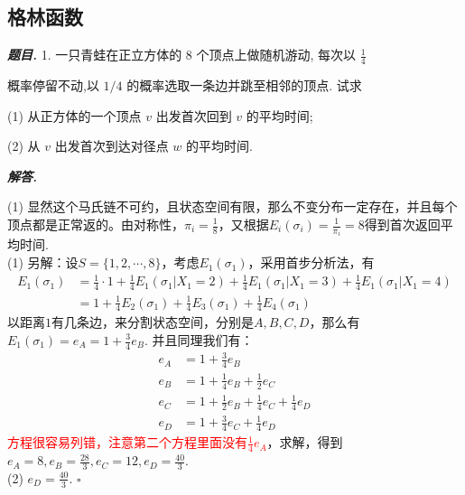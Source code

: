 \documentclass[10pt, a4paper, oneside]{ctexart}
\newenvironment{problem}{\begin{framed}\par\noindent\textbf{\textit{题目. }}}{\end{framed}\par}
\newenvironment{solution}{%
  \par\noindent\textbf{\textit{解答. }}\ignorespaces
}{%
  \hfill\ensuremath{\square}\par %
}
\begin{document}
\subsection{格林函数}
\begin{problem}
    1. 一只青蛙在正立方体的 8 个顶点上做随机游动, 每次以 $\frac{1}{4}$

概率停留不动,以 \( 1/4 \) 的概率选取一条边并跳至相邻的顶点. 试求

(1) 从正方体的一个顶点 \( v \) 出发首次回到 \( v \) 的平均时间;

(2) 从 \( v \) 出发首次到达对径点 \( w \) 的平均时间.
\end{problem}
\begin{solution}
    (1) 显然这个马氏链不可约，且状态空间有限，那么不变分布一定存在，并且每个顶点都是正常返的。由对称性，$\pi_i=\frac{1}{8}$，又根据$E_i(\sigma_i)=\frac{1}{\pi_i}=8$得到首次返回平均时间.\\
    (1) 另解：设$S=\{1,2,\cdots,8\}$，考虑$E_1(\sigma_1)$，采用首步分析法，有
    \begin{align*}
        E_1(\sigma_1)&=\frac{1}{4}\cdot 1+\frac{1}{4} E_1(\sigma_1|X_1=2)+\frac{1}{4} E_1(\sigma_1|X_1=3)+\frac{1}{4} E_1(\sigma_1|X_1=4)\\
        &=1+\frac{1}{4}E_2(\sigma_1)+\frac{1}{4}E_3(\sigma_1)+\frac{1}{4}E_4(\sigma_1)
    \end{align*}
    以距离$1$有几条边，来分割状态空间，分别是$A,B,C,D$，那么有$E_{1}(\sigma_1)=e_A=1+\frac{3}{4}e_B$. 并且同理我们有：
    \begin{align*}
        e_A&=1+\frac{3}{4}e_B\\e_B&=1+\frac{1}{4}e_B+\frac{1}{2}e_C\\e_C&=1+\frac{1}{2}e_B+\frac{1}{4}e_C+\frac{1}{4}e_D\\e_D&=1+\frac{3}{4}e_C+\frac{1}{4}e_D
    \end{align*}
    \textcolor{red}{方程很容易列错，注意第二个方程里面没有$\frac{1}{4}e_A$}，求解，得到$e_A=8,e_B=\frac{28}{3},e_C=12,e_D=\frac{40}{3}$.\\(2) $e_D=\frac{40}{3}$.
\end{solution}
\end{document}
